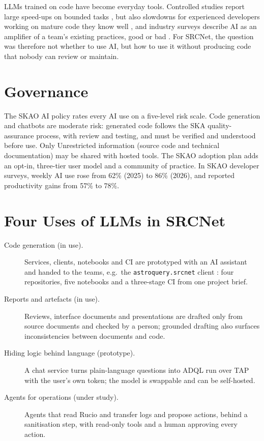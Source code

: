 \documentclass[11pt,twoside]{article}
\begin{document}
LLMs trained on code \citep{2021arXiv210703374C} have become everyday tools.
Controlled studies report large speed-ups on bounded tasks
\citep{2023arXiv230206590P}, but also slowdowns for experienced developers
working on mature code they know well \citep{2025arXiv250709089B}, and
industry surveys describe AI as an amplifier of a team's existing practices,
good or bad \citep{DORA2025}. For SRCNet, the question was therefore not
whether to use AI, but how to use it without producing code that nobody can
review or maintain.

\section{Governance}

The SKAO AI policy \citep{SKAO-GOV-0000166} rates every AI use on a
five-level risk scale. Code generation and chatbots are moderate risk:
generated code follows the SKA quality-assurance process, with review and
testing, and must be verified and understood before use. Only Unrestricted
information (source code and technical documentation) may be shared with
hosted tools. The SKAO adoption plan \citep{SKAO-GOV-0000194} adds an opt-in,
three-tier user model and a community of practice. In SKAO developer surveys,
weekly AI use rose from 62\% (2025) to 86\% (2026), and reported productivity
gains from 57\% to 78\%.

\section{Four Uses of LLMs in SRCNet}

\begin{description}
\item[Code generation (in use).] Services, clients, notebooks and CI are
prototyped with an AI assistant and handed to the teams, e.g.\ the
\texttt{astroquery.srcnet} client \citep{2019AJ....157...98G}: four
repositories, five notebooks and a three-stage CI from one project brief.
\item[Reports and artefacts (in use).] Reviews, interface documents and
presentations are drafted only from source documents and checked by a person;
grounded drafting also surfaces inconsistencies between documents and code.
\item[Hiding logic behind language (prototype).] A chat service turns
plain-language questions into ADQL \citep{2023ivoa.spec.1215M} run over TAP
\citep{2019ivoa.spec.0927D} with the user's own token; the model is swappable
and can be self-hosted.
\item[Agents for operations (under study).] Agents that read Rucio and
transfer logs and propose actions, behind a sanitisation step, with read-only
tools and a human approving every action.
\end{description}
\end{document}
